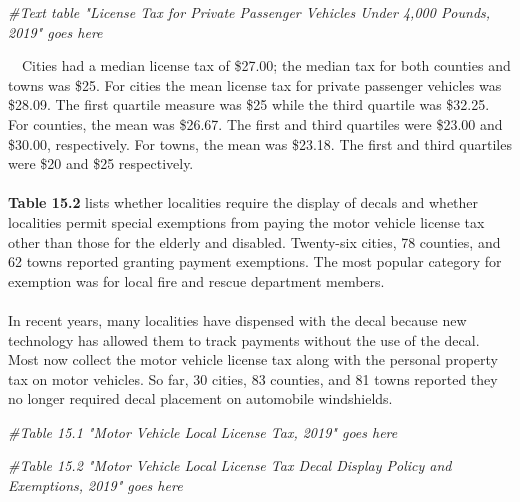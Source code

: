 \documentclass[
]{book}
\newenvironment{Shaded}{\begin{snugshade}}{\end{snugshade}}
\newcommand{\CommentTok}[1]{\textcolor[rgb]{0.56,0.35,0.01}{\textit{#1}}}
\begin{document}
\begin{Shaded}
\begin{Highlighting}[]
\CommentTok{\#Text table "License Tax for Private Passenger Vehicles Under 4,000 Pounds, 2019" goes here}
\end{Highlighting}
\end{Shaded}

\hfill\break
~~Cities had a median license tax of \$27.00; the median tax for both counties and towns was \$25. For cities the mean license tax for private passenger vehicles was \$28.09. The first quartile measure was \$25 while the third quartile was \$32.25. For counties, the mean was \$26.67. The first and third quartiles were \$23.00 and \$30.00, respectively. For towns, the mean was \$23.18. The first and third quartiles were \$20 and \$25 respectively.\\
~\\
\hspace*{0.333em}\hspace*{0.333em}\textbf{Table 15.2} lists whether localities require the display of decals and whether localities permit special exemptions from paying the motor vehicle license tax other than those for the elderly and disabled. Twenty-six cities, 78 counties, and 62 towns reported granting payment exemptions. The most popular category for exemption was for local fire and rescue department members.\\
~\\
\hspace*{0.333em}\hspace*{0.333em}In recent years, many localities have dispensed with the decal because new technology has allowed them to track payments without the use of the decal. Most now collect the motor vehicle license tax along with the personal property tax on motor vehicles. So far, 30 cities, 83 counties, and 81 towns reported they no longer required decal placement on automobile windshields.\\

\begin{Shaded}
\begin{Highlighting}[]
\CommentTok{\#Table 15.1 "Motor Vehicle Local License Tax, 2019" goes here}

\CommentTok{\#Table 15.2 "Motor Vehicle Local License Tax Decal Display Policy and Exemptions, 2019" goes here}
\end{Highlighting}
\end{Shaded}
\end{document}
